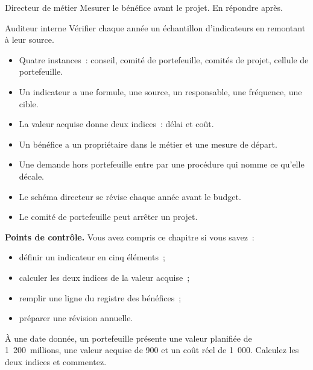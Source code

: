 \begin{boxmetier}{Directeur de métier}
Mesurer le bénéfice avant le projet. En répondre après.
\end{boxmetier}

\begin{boxmetier}{Auditeur interne}
Vérifier chaque année un échantillon d'indicateurs en remontant à leur source.
\end{boxmetier}

\begin{boxresume}
\begin{itemize}
    \item Quatre instances~: conseil, comité de portefeuille, comités de projet, cellule de portefeuille.
    \item Un indicateur a une formule, une source, un responsable, une fréquence, une cible.
    \item La valeur acquise donne deux indices~: délai et coût.
    \item Un bénéfice a un propriétaire dans le métier et une mesure de départ.
    \item Une demande hors portefeuille entre par une procédure qui nomme ce qu'elle décale.
    \item Le schéma directeur se révise chaque année avant le budget.
    \item Le comité de portefeuille peut arrêter un projet.
\end{itemize}
\end{boxresume}

\begin{boxinfo}
\textbf{Points de contrôle.} Vous avez compris ce chapitre si vous savez~:
\begin{itemize}
    \item définir un indicateur en cinq éléments~;
    \item calculer les deux indices de la valeur acquise~;
    \item remplir une ligne du registre des bénéfices~;
    \item préparer une révision annuelle.
\end{itemize}
\end{boxinfo}

\begin{boxexo}[title={\ding{45}\quad Exercice~13.1. Deux indices \niveaubase}]
À une date donnée, un portefeuille présente une valeur planifiée de 1~200~millions, une valeur acquise de 900 et un coût réel de 1~000. Calculez les deux indices et commentez.
\end{boxexo}

